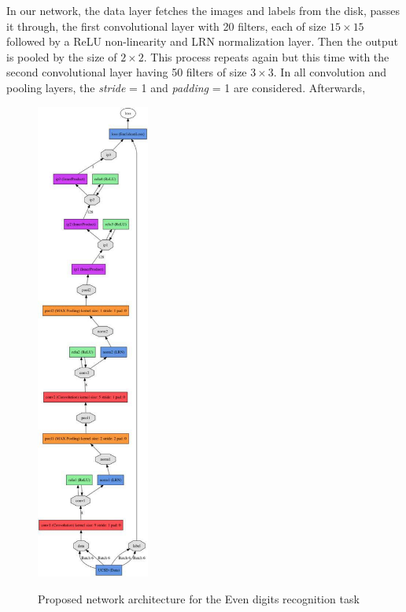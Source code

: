 \indent In our network, the data layer fetches the images and labels from the disk, passes it through, the first convolutional layer with 20 filters, each of size $15\times15$ followed by a ReLU non-linearity and LRN normalization layer. Then the output is pooled by the size of $2\times2$. This process repeats again but this time with the second convolutional layer having 50 filters of size $3\times3$. In all convolution and pooling layers, the \textit{stride} = 1 and \textit{padding} = 1 are considered.  Afterwards,
\begin{figure}
  \centering
   {\includegraphics[width=0.33\textwidth]{images/model}}
	\caption{Proposed network architecture for the  Even digits recognition task}
	\label{fig:l2cNet}
\end{figure}

